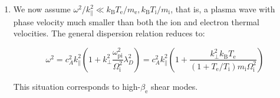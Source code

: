 \begin{enumerate}
    which is the dispersion relation of the so-called kinetic Alfvén wave. It is convenient to introduce the fictitious ion Larmor radius via the ion acoustic velocity:
    
    \begin{equation}
        \rho_\mathrm{i}^2=\frac{1}{c_A^2}\frac{k_\mathrm{B}T_\text{e}}{m_\text{e}}\frac{c^2}{\omega_\text{pe}^2}=\frac{\mu_0n_\mathrm{i}m_\mathrm{i}}{B^2}\frac{k_\mathrm{B}T_\text{e}}{m_\text{e}}\frac{\varepsilon_0c^2m_\text{e}}{n_\text{e}q_\text{e}^2}=\frac{n_\mathrm{i} m_\mathrm{i}k_\mathrm{B}T_\text{e}}{B^2n_\text{e}q_\text{e}^2}=\frac{Zm_\mathrm{i}^2}{B^2q_\mathrm{i}^2}\frac{k_\mathrm{B}T_\text{e}}{m_\mathrm{i}}
    \end{equation}
    
    If $k_\perp^2\rho_\mathrm{i}^2$ isn't too large, then $\omega/k_\parallel$ is of the order of the Alfvén velocity, and the condition $\omega^2\ll k_\parallel^2k_\mathrm{B}T_\text{e}/m_\text{e}$ corresponds to having $\beta_\text{e}\gg m_\text{e}/m_\mathrm{i}$. The assumed condition $\omega^2/k_\parallel^2\gg k_\mathrm{B}T_\text{e}/m_\mathrm{i}$ corresponds to $\beta_\text{e}\ll1$. The kinetic Alfvén wave is thus faithfully described by the previous dispersion relation in the regime $m_\text{e}/m_\mathrm{i}\ll\beta_\text{e}\ll1$.

    \item We now assume $\omega^2/k_\parallel^2\ll k_\mathrm{B}T_\text{e}/m_\text{e}, k_\mathrm{B}T_\mathrm{i}/m_\mathrm{i}$, that is, a plasma wave with phase velocity much smaller than both the ion and electron thermal velocities. The general dispersion relation reduces to:
    
    \begin{equation}
        \omega^2=c_A^2k_\parallel^2\left(1+k_\perp^2\frac{\omega_\text{pi}^2}{\Omega_\mathrm{i}^2}\lambda_D^2\right)=c_A^2k_\parallel^2\left(1+\frac{k_\perp^2k_\mathrm{B}T_\text{e}}{(1+T_\text{e}/T_\mathrm{i})m_\mathrm{i}\Omega_\mathrm{i}^2}\right)
    \end{equation}
    
    This situation corresponds to high-$\beta_\text{e}$ shear modes.

\end{enumerate}

